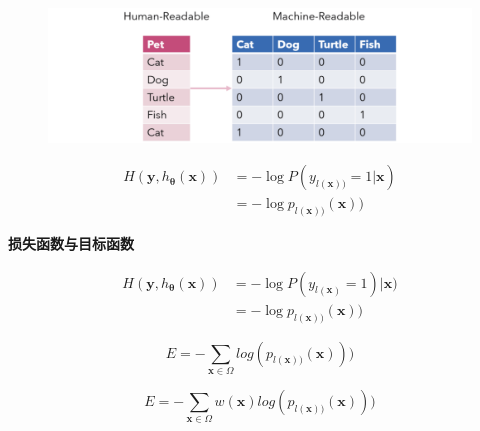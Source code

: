 \documentclass{beamer}%
\begin{document}
\begin{frame}
\begin{figure}
   \vspace{-0.2cm}  %
   \setlength{\belowcaptionskip}{-0.4cm}   %
   \setlength{\abovecaptionskip}{0.4cm}   %
  \centering%
    \hspace{2.5cm}\includegraphics[width=0.6\linewidth]{one-hot-encoding.png}
\end{figure}
{\setlength\abovedisplayskip{0.1cm}
\setlength\belowdisplayskip{0.1cm}
\begin{equation}\label{equ:cross_entropy}
    \begin{split}
    H(\mathbf{y}, h_{\mathbf{\theta}}(\mathbf{x})) &= -\log P(y_{l(\mathbf{x}))} = 1|\mathbf{x})\\
                                                   &= -\log p_{l(\mathbf{x}))}(\mathbf{x}))
    \end{split}
\end{equation}
}

\end{frame}

\begin{frame}
\vspace{-0.1cm}
{\noindent\large\textbf{损失函数与目标函数}}
\vspace{0.4cm}

{\setlength\abovedisplayskip{0.1cm}
\setlength\belowdisplayskip{0.1cm}
\begin{equation}\label{equ:cross_entropy}
    \begin{split}
    H(\mathbf{y}, h_{\mathbf{\theta}}(\mathbf{x})) &= -\log P(y_{l(\mathbf{x})}=1)|\mathbf{x})\\
                                                   &= -\log p_{l(\mathbf{x}))}(\mathbf{x}))
    \end{split}
\end{equation}
}

\begin{equation}\label{equ:cross_entropysimplized}
   E = -\sum\limits_{\mathbf{x} \in \Omega} log(p_{l(\mathbf{x}))}(\mathbf{x})))
\end{equation}

\begin{equation}\label{equ:unetobj}
   E = -\sum\limits_{\mathbf{x} \in \Omega} w(\mathbf{x}) log(p_{l(\mathbf{x}))}(\mathbf{x})))
\end{equation}
\end{frame}
\end{document}
